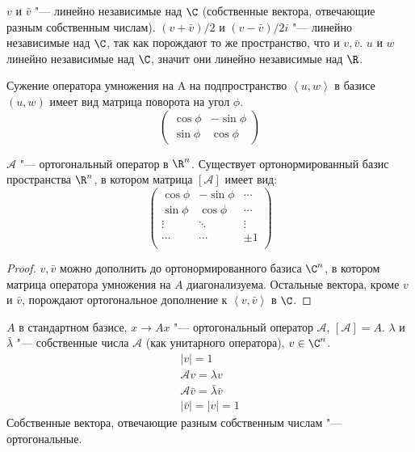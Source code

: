 $v$ и $\bar v$ "--- линейно независимые над $\C$ (собственные вектора, отвечающие разным собственным числам).
$(v + \bar v)/2$ и $(v - \bar v)/2i$ "--- линейно независимые над $\C$, так как порождают то же пространство, что и $v, \bar v$.
$u$ и $w$ линейно независимые над $\C$, значит они линейно независимые над $\R$.

Сужение оператора умножения на A на подпространство $\left<u, w\right>$ в базисе $(u, w)$
имеет вид матрица поворота на угол $\phi$. 
\[ \begin{pmatrix}
	\cos \phi & -\sin \phi \\
 	\sin \phi &  \cos \phi
\end{pmatrix} \]                    

\begin{theorem}
	$\mathcal A$ "--- ортогональный оператор в $\R^n$.
	Существует ортонормированный базис пространства $\R^n$, в котором матрица $[\mathcal A]$ имеет вид:
	\[ \begin{pmatrix}
 		\cos \phi & -\sin \phi & \cdots\\
 		\sin \phi & \cos \phi & \cdots\\
 		\vdots & \ddots & \vdots\\
 		\cdots & \cdots & \pm 1\\
 	\end{pmatrix} \]
\end{theorem}
\begin{proof}
	$v, \bar v$ можно дополнить до ортонормированного базиса $\C^n$, в котором матрица оператора умножения на $A$ диагонализуема.
	Остальные вектора, кроме $v$ и $\bar v$, порождают ортогональное дополнение к $\left<v, \bar v\right>$ в $\C$.
\end{proof}

$A$ в стандартном базисе, $x \to Ax$ "--- ортогональный оператор $\mathcal A$, $[\mathcal A] = A$.
$\lambda$ и $\bar \lambda$ "--- собственные числа $\mathcal A$ (как унитарного оператора), $v \in \C^n$.
\begin{gather*}
	|v| = 1 \\
	\mathcal Av = \lambda v \\
	\mathcal A\bar v = \bar \lambda \bar v \\
	|\bar v| = |v| = 1
\end{gather*}
Собственные вектора, отвечающие разным собственным числам "--- ортогональные. 


